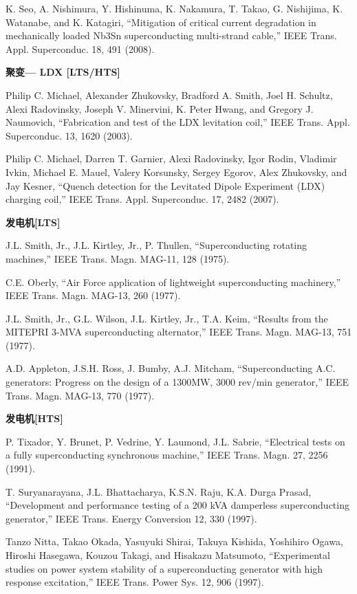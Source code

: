 \noindent [9.56] K. Seo, A. Nishimura, Y. Hishinuma, K. Nakamura, T. Takao, G. Nishijima, K.
Watanabe, and K. Katagiri, ``Mitigation of critical current degradation in mechanically
loaded Nb3Sn superconducting multi-strand cable,” IEEE Trans. Appl.
Superconduc. 18, 491 (2008).

\noindent \textbf{聚变--- LDX [LTS/HTS] }

\noindent [9.57] Philip C. Michael, Alexander Zhukovsky, Bradford A. Smith, Joel H. Schultz, Alexi
Radovinsky, Joseph V. Minervini, K. Peter Hwang, and Gregory J. Naumovich,
``Fabrication and test of the LDX levitation coil,” IEEE Trans. Appl. Superconduc.
13, 1620 (2003).

\noindent [9.58] Philip C. Michael, Darren T. Garnier, Alexi Radovinsky, Igor Rodin, Vladimir
Ivkin, Michael E. Mauel, Valery Korsunsky, Sergey Egorov, Alex Zhukovsky, and
Jay Kesner, ``Quench detection for the Levitated Dipole Experiment (LDX) charging
coil,” IEEE Trans. Appl. Superconduc. 17, 2482 (2007).

\noindent \textbf{发电机[LTS] }

\noindent [9.59] J.L. Smith, Jr., J.L. Kirtley, Jr., P. Thullen, ``Superconducting rotating machines,”
IEEE Trans. Magn. MAG-11, 128 (1975).

\noindent [9.60] C.E. Oberly, ``Air Force application of lightweight superconducting machinery,”
IEEE Trans. Magn. MAG-13, 260 (1977).

\noindent [9.61] J.L. Smith, Jr., G.L. Wilson, J.L. Kirtley, Jr., T.A. Keim, ``Results from the MITEPRI
3-MVA superconducting alternator,” IEEE Trans. Magn. MAG-13, 751
(1977).

\noindent [9.62] A.D. Appleton, J.S.H. Ross, J. Bumby, A.J. Mitcham, ``Superconducting A.C.
generators: Progress on the design of a 1300MW, 3000 rev/min generator,” IEEE
Trans. Magn. MAG-13, 770 (1977).

\noindent \textbf{发电机[HTS] }

\noindent [9.63] P. Tixador, Y. Brunet, P. Vedrine, Y. Laumond, J.L. Sabrie, ``Electrical tests on a
fully superconducting synchronous machine,” IEEE Trans. Magn. 27, 2256 (1991).

\noindent [9.64] T. Suryanarayana, J.L. Bhattacharya, K.S.N. Raju, K.A. Durga Prasad, ``Development
and performance testing of a 200 kVA damperless superconducting generator,”
IEEE Trans. Energy Conversion 12, 330 (1997).

\noindent [9.65] Tanzo Nitta, Takao Okada, Yasuyuki Shirai, Takuya Kishida, Yoshihiro Ogawa,
Hiroshi Hasegawa, Kouzou Takagi, and Hisakazu Matsumoto, ``Experimental studies
on power system stability of a superconducting generator with high response
excitation,” IEEE Trans. Power Sys. 12, 906 (1997).

